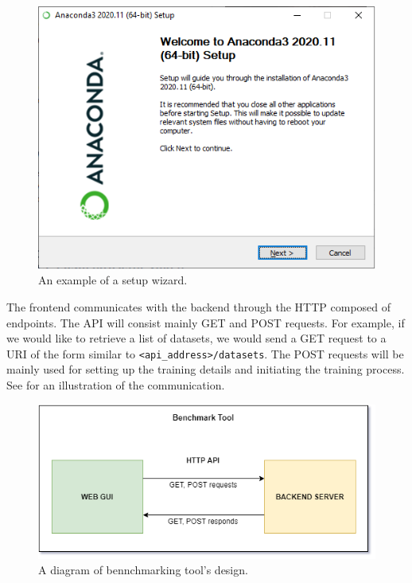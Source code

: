 \begin{figure}[h]
    \centering
    \includegraphics[width=0.65\linewidth]{Sources/Figures/anaconda.png}
    \caption{An example of a setup wizard.}
    \label{fig:wizard}
\end{figure}

The frontend communicates with the backend through the HTTP  composed of 
endpoints. The API will consist mainly GET and POST requests. For example, if we
would like to retrieve a list of datasets, we would send a GET request to a URI
of the form similar to \texttt{<api\_address>/datasets}. The POST requests will
be mainly used for setting up the training details and initiating the training
process. See  for an illustration of the communication.

\begin{figure}[h]
    \centering
    \includegraphics[width=0.85\linewidth]{Sources/Figures/tool_design.png}
    \caption{A diagram of bennchmarking tool's design.}
    \label{fig:tool_design}
\end{figure}


